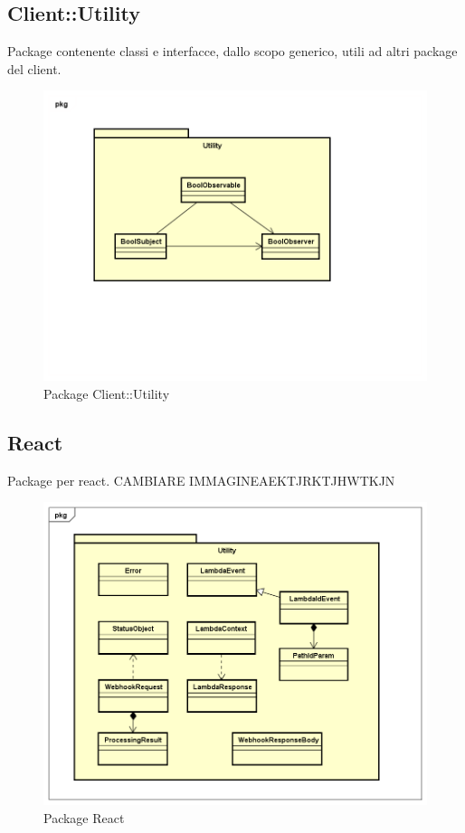 \subsection{Client::Utility}
Package contenente classi e interfacce, dallo scopo generico, utili ad altri package del client.
\begin{figure}[h] \centering \includegraphics[width=\textwidth,height=\textheight,keepaspectratio]{images/diagrams/client/Client/Utility.png}
\caption{Package Client::Utility}
\end{figure}
\newpage

\subsection{React}
Package per react. CAMBIARE IMMAGINEAEKTJRKTJHWTKJN
\begin{figure}[h] \centering \includegraphics[width=\textwidth,height=\textheight,keepaspectratio]{images/diagrams/back-end/Official_Backend_0304/Utility.png}
\caption{Package React}
\end{figure}
\newpage


